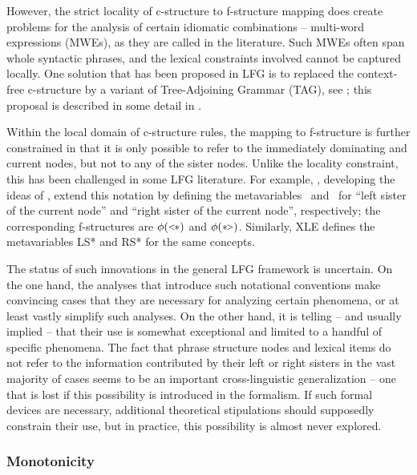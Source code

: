 \documentclass[output=paper,hidelinks]{langscibook}
\begin{document}
 However, the strict locality of c-structure to f-structure mapping does create problems for the analysis of certain idiomatic combinations -- multi-word expressions (MWEs), as they are called in the literature. Such MWEs often span whole syntactic phrases, and the lexical constraints involved cannot be captured locally. One solution that has been proposed in LFG is to replaced the context-free c-structure by a variant of Tree-Adjoining Grammar (TAG), see \textcite{findlay2017,findlay2019}; this proposal is described in some detail in .

 Within the local domain of c-structure rules, the mapping to f-structure is further constrained in that it is only possible to refer to the immediately dominating and current nodes, but not to any of the sister nodes. Unlike the locality constraint, this has been challenged in some LFG literature. For example, \textcites[120]{dalrymple01}[222--223]{DLM:LFG}, developing the ideas of \textcite{nordlinger1998constructive}, extend this notation by defining the metavariables \LSTAR\ and \RSTAR\ for ``left sister of the current node'' and ``right sister of the current node'', respectively; the corresponding f-structures are $\phi(\LSTAR)$ and $\phi(\RSTAR)$. Similarly, XLE defines the metavariables LS* and RS* for the same concepts.
 
 The status of such innovations in the general LFG framework is uncertain. On the one hand, the analyses that introduce such notational conventions make convincing cases that they are necessary for analyzing certain phenomena, or at least vastly simplify such analyses. On the other hand, it is telling -- and usually implied -- that their use is somewhat exceptional and limited to a handful of specific phenomena. The fact that phrase structure nodes and lexical items do not refer to the information contributed by their left or right sisters in the vast majority of cases seems to be an important cross-linguistic generalization -- one that is lost if this possibility is introduced in the formalism. If such formal devices are necessary, additional theoretical stipulations should supposedly constrain their use, but in practice, this possibility is almost never explored. %
 
 \subsubsection{Monotonicity}
 
\end{document}

